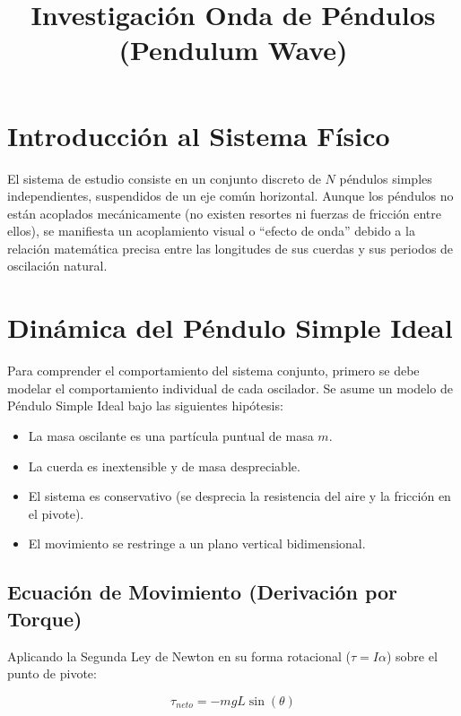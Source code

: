 \documentclass[12pt, a4paper]{article}
\title{\textbf{Investigación Onda de Péndulos \\ (Pendulum Wave)}}
\author{}
\date{}
\begin{document}
	
		
	
	\maketitle
	
	\section{Introducción al Sistema Físico}
	
	El sistema de estudio consiste en un conjunto discreto de $N$ péndulos simples independientes, suspendidos de un eje común horizontal. Aunque los péndulos no están acoplados mecánicamente (no existen resortes ni fuerzas de fricción entre ellos), se manifiesta un acoplamiento visual o ``efecto de onda'' debido a la relación matemática precisa entre las longitudes de sus cuerdas y sus periodos de oscilación natural.
	
	\section{Dinámica del Péndulo Simple Ideal}
	
	Para comprender el comportamiento del sistema conjunto, primero se debe modelar el comportamiento individual de cada oscilador. Se asume un modelo de Péndulo Simple Ideal bajo las siguientes hipótesis:
	
	\begin{itemize}
		\item La masa oscilante es una partícula puntual de masa $m$.
		\item La cuerda es inextensible y de masa despreciable.
		\item El sistema es conservativo (se desprecia la resistencia del aire y la fricción en el pivote).
		\item El movimiento se restringe a un plano vertical bidimensional.
	\end{itemize}
	
	\subsection{Ecuación de Movimiento (Derivación por Torque)}
	
	Aplicando la Segunda Ley de Newton en su forma rotacional ($\tau = I \alpha$) sobre el punto de pivote:
	
	\begin{equation}
		\tau_{neto} = -mgL \sin(\theta)
	\end{equation}
	
\end{document}
